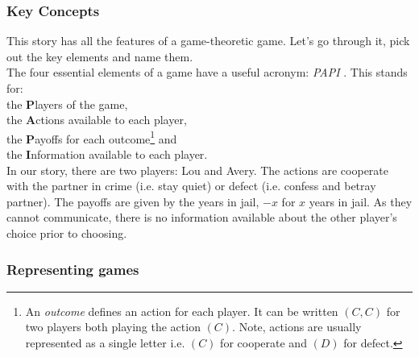 \subsubsection{Key Concepts}
This story has all the features of a game-theoretic game. Let's go through it, pick out the key elements and name them.\\
The four essential elements of a game have a useful acronym: \textit{PAPI} \cite{rasmusen}. This stands for:\\
the \textbf{P}layers of the game,\\
the \textbf{A}ctions available to each player,\\
the \textbf{P}ayoffs for each outcome\footnote{An \textit{outcome} defines an action for each player. It can be written $(C,C)$ for two players both playing the action $(C)$. Note, actions are usually represented as a single letter i.e. $(C)$ for cooperate and $(D)$ for defect. } and\\
the \textbf{I}nformation available to each player.\\

In our story, there are two players: Lou and Avery. The actions are cooperate with the partner in crime (i.e. stay quiet) or defect (i.e. confess and betray partner). The payoffs are given by the years in jail, $-x$ for $x$ years in jail. As they cannot communicate, there is no information available about the other player's choice prior to choosing.
\subsubsection{Representing games}
